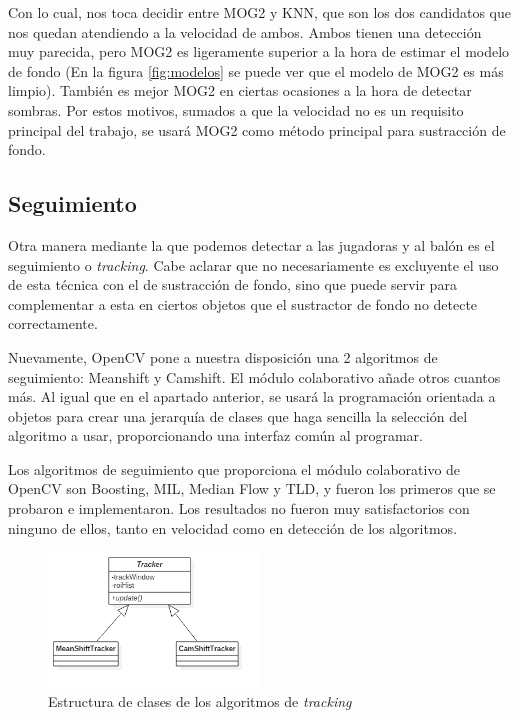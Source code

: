 Con lo cual, nos toca decidir entre MOG2 y KNN, que son los dos candidatos que nos quedan atendiendo a la velocidad de ambos. Ambos tienen una detección muy parecida, pero MOG2 es ligeramente superior a la hora de estimar el modelo de fondo (En la figura \ref{fig:modelos} se puede ver que el modelo de MOG2 es más limpio). También es mejor MOG2 en ciertas ocasiones a la hora de detectar sombras. Por estos motivos, sumados a que la velocidad no es un requisito principal del trabajo, se usará MOG2 como método principal para sustracción de fondo.

\subsection{Seguimiento}
Otra manera mediante la que podemos detectar a las jugadoras y al balón es el seguimiento o \textit{tracking}. Cabe aclarar que no necesariamente es excluyente el uso de esta técnica con el de sustracción de fondo, sino que puede servir para complementar a esta en ciertos objetos que el sustractor de fondo no detecte correctamente.

Nuevamente, OpenCV pone a nuestra disposición una 2 algoritmos de seguimiento: Meanshift y Camshift. El módulo colaborativo añade otros cuantos más. Al igual que en el apartado anterior, se usará la programación orientada a objetos para crear una jerarquía de clases que haga sencilla la selección del algoritmo a usar, proporcionando una interfaz común al programar.

Los algoritmos de seguimiento que proporciona el módulo colaborativo de OpenCV son Boosting, MIL, Median Flow y TLD, y fueron los primeros que se probaron e implementaron. Los resultados no fueron muy satisfactorios con ninguno de ellos, tanto en velocidad como en detección de los algoritmos.

\begin{figure}
    \centering
    \includegraphics[width=0.5\textwidth]{images/trackers}
    \caption{Estructura de clases de los algoritmos de \textit{tracking}}
    \label{fig:trackers}
\end{figure}

